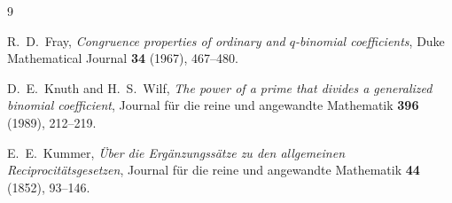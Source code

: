 \documentclass[11pt,a4paper]{article}
\theoremstyle{definition}
\theoremstyle{remark}
\begin{document}
\begin{thebibliography}{9}

R.~D.~Fray,
\emph{Congruence properties of ordinary and $q$-binomial coefficients},
Duke Mathematical Journal \textbf{34} (1967), 467--480.

D.~E.~Knuth and H.~S.~Wilf,
\emph{The power of a prime that divides a generalized binomial coefficient},
Journal f\"ur die reine und angewandte Mathematik \textbf{396} (1989), 212--219.

E.~E.~Kummer,
\emph{\"Uber die Erg\"anzungss\"atze zu den allgemeinen Reciprocit\"atsgesetzen},
Journal f\"ur die reine und angewandte Mathematik \textbf{44} (1852), 93--146.

\end{thebibliography}
\end{document}
